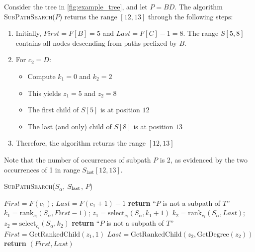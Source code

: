 \begin{example}
    Consider the tree in \cref{fig:example_tree}, and let $P = BD$. The algorithm \textsc{SubPathSearch}($P$) returns the range $[12, 13]$ through the following steps:

    \begin{enumerate}
        \item Initially, $First = F[B] = 5$ and $Last = F[C] - 1 = 8$. The range $S[5,8]$ contains all nodes descending from paths prefixed by $B$.
        
        \item For $c_2 = D$:
        \begin{itemize}
            \item Compute $k_1 = 0$ and $k_2 = 2$
            \item This yields $z_1 = 5$ and $z_2 = 8$
            \item The first child of $S[5]$ is at position $12$
            \item The last (and only) child of $S[8]$ is at position $13$
        \end{itemize}
        
        \item Therefore, the algorithm returns the range $[12,13]$
    \end{enumerate}

    Note that the number of occurrences of subpath $P$ is 2, as evidenced by the two occurrences of 1 in range $S_{\text{last}}[12,13]$.
\end{example}

\begin{algorithm}[H]
    \caption{\textsc{SubPathSearch}($S_\alpha$, $S_{\textup{last}}$, $P$)}
    \label{alg:subpathsearch}
    \begin{algorithmic}[1]
    \State $First = F(c_1)$; $Last = F(c_1 + 1) - 1$
        \State \textbf{return} ``$P$ is not a subpath of $T$''
    \EndIf
        \State $k_1 = \text{rank}_{c_i}(S_\alpha, First - 1)$; 
        \State $z_1 = \text{select}_{c_i}(S_\alpha, k_1 + 1)$
        \State $k_2 = \text{rank}_{c_i}(S_\alpha, Last)$; 
        \State $z_2 = \text{select}_{c_i}(S_\alpha, k_2)$
            \State \textbf{return} ``$P$ is not a subpath of $T$''
        \EndIf
        \State $First = \text{GetRankedChild}(z_1, 1)$ 
        \State $Last = \text{GetRankedChild}(z_2, \text{GetDegree}(z_2))$ 
    \EndFor
    \State \textbf{return} $(First, Last)$
    \end{algorithmic}
\end{algorithm}


